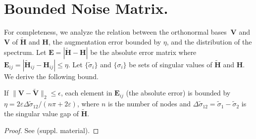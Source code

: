 
\section{Bounded Noise Matrix.}
For completeness, we  analyze the relation between the orthonormal bases $\  {\mathbf{V}}$ and $\mathbf{V}$ of   $\widetilde{\mathbf{H}}$ and $\mathbf{H}$, the augmentation error bounded by $\eta$, and the distribution of the spectrum. Let $\mathbf{E} = |\widetilde{\mathbf{H}} - \mathbf{H}|$ be  the absolute error matrix where $\mathbf{E}_{ij} = |\widetilde{\mathbf{H}}_{ij} - \mathbf{H}_{ij}| \leq \eta$. Let $\{\widetilde{\sigma}_i\}$ and $\{\sigma_i\}$ be sets of singular values of $\widetilde{\mathbf{H}}$ and $\mathbf{H}$. We derive the following bound.
\begin{proposition}
\label{prop:ebound}
If %
$\|\mathbf{V}\!-\!\widetilde{\mathbf{V}}\|_2\!\leq\!\epsilon$,  each element in $\mathbf{E}_{ij}$ (the absolute error) is bounded by %
$\eta = 2 \varepsilon\Delta\tilde{\sigma}_{12} /(n\pi+2\varepsilon)$, where $n$ is the number of nodes and $\Delta\tilde{\sigma}_{12}=\widetilde{\sigma}_1-\widetilde{\sigma}_2$ is the singular value gap  of $\widetilde{\mathbf{H}}$.
\end{proposition}
\vspace{-1cm}
\begin{proof}
See  (suppl. material).
\end{proof}

